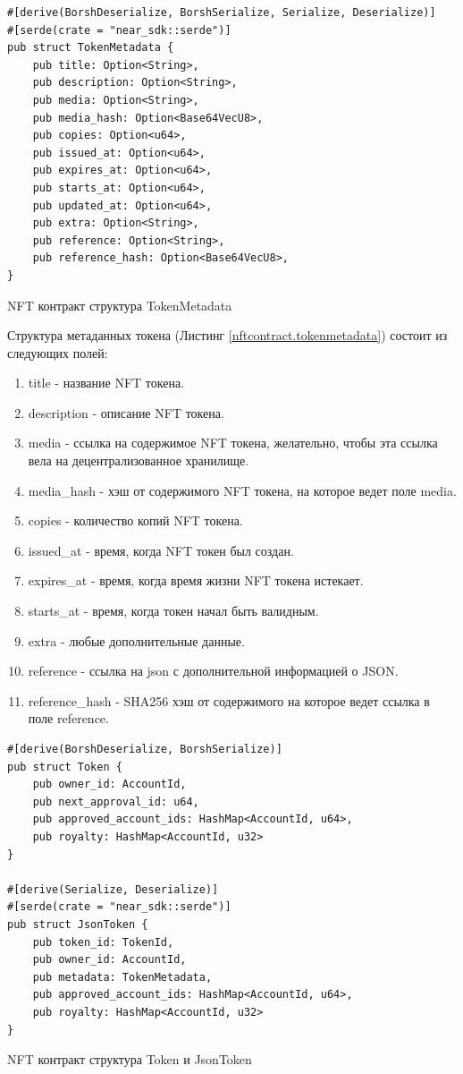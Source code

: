 \begin{listing}
\begin{verbatim}
#[derive(BorshDeserialize, BorshSerialize, Serialize, Deserialize)]
#[serde(crate = "near_sdk::serde")]
pub struct TokenMetadata {
    pub title: Option<String>,
    pub description: Option<String>,
    pub media: Option<String>,
    pub media_hash: Option<Base64VecU8>,
    pub copies: Option<u64>,
    pub issued_at: Option<u64>,
    pub expires_at: Option<u64>,
    pub starts_at: Option<u64>,
    pub updated_at: Option<u64>,
    pub extra: Option<String>,
    pub reference: Option<String>,
    pub reference_hash: Option<Base64VecU8>,
}
\end{verbatim}
\caption{NFT контракт структура TokenMetadata}
\label{nftcontract.tokenmetadata}
\end{listing}

Структура метаданных токена (Листинг {\color{blue} \ref{nftcontract.tokenmetadata}}) состоит из следующих полей:
\begin{enumerate}

\item title - название NFT токена.
\item description - описание NFT токена.
\item media - ссылка на содержимое NFT токена, желательно, чтобы эта ссылка вела на децентрализованное хранилище.
\item media\_hash - хэш от содержимого NFT токена, на которое ведет поле media.
\item copies - количество копий NFT токена.
\item issued\_at - время, когда NFT токен был создан.
\item expires\_at - время, когда время жизни NFT токена истекает.
\item starts\_at - время, когда токен начал быть валидным.
\item extra - любые дополнительные данные.
\item reference - ссылка на json с дополнительной информацией о JSON.
\item reference\_hash - SHA256 хэш от содержимого на которое ведет ссылка в поле reference.

\end{enumerate}

\begin{listing}[H]
\begin{verbatim}
#[derive(BorshDeserialize, BorshSerialize)]
pub struct Token {
    pub owner_id: AccountId,
    pub next_approval_id: u64,
    pub approved_account_ids: HashMap<AccountId, u64>,
    pub royalty: HashMap<AccountId, u32>
}

#[derive(Serialize, Deserialize)]
#[serde(crate = "near_sdk::serde")]
pub struct JsonToken {
    pub token_id: TokenId,
    pub owner_id: AccountId,
    pub metadata: TokenMetadata,
    pub approved_account_ids: HashMap<AccountId, u64>,
    pub royalty: HashMap<AccountId, u32>
}
\end{verbatim}
\caption{NFT контракт структура Token и JsonToken}
\label{nftcontract.tokenstructs}
\end{listing}

